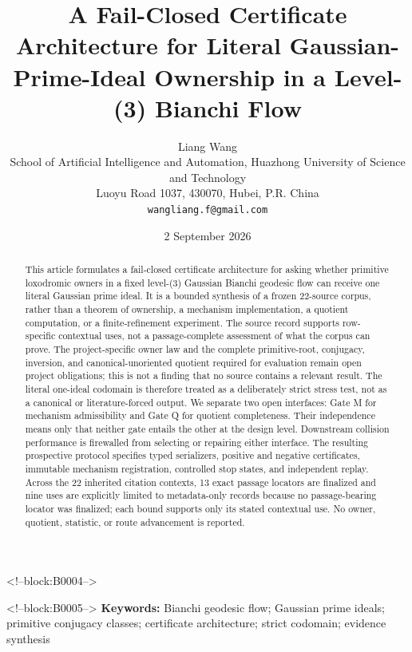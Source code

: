 \documentclass[11pt,a4paper]{article}
\title{A Fail-Closed Certificate Architecture for Literal Gaussian-Prime-Ideal Ownership in a Level-(3) Bianchi Flow}
\author{Liang Wang\\
\small School of Artificial Intelligence and Automation, Huazhong University of Science and Technology\\
\small Luoyu Road 1037, 430070, Hubei, P.R. China\\
\small \texttt{wangliang.f@gmail.com}}
\date{2 September 2026}
\begin{document}
\maketitle

<!--block:B0004-->
\begin{abstract}
This article formulates a fail-closed certificate architecture for asking whether primitive loxodromic owners in a fixed level-(3) Gaussian Bianchi geodesic flow can receive one literal Gaussian prime ideal. It is a bounded synthesis of a frozen 22-source corpus, rather than a theorem of ownership, a mechanism implementation, a quotient computation, or a finite-refinement experiment. The source record supports row-specific contextual uses, not a passage-complete assessment of what the corpus can prove. The project-specific owner law and the complete primitive-root, conjugacy, inversion, and canonical-unoriented quotient required for evaluation remain open project obligations; this is not a finding that no source contains a relevant result. The literal one-ideal codomain is therefore treated as a deliberately strict stress test, not as a canonical or literature-forced output. We separate two open interfaces: Gate M for mechanism admissibility and Gate Q for quotient completeness. Their independence means only that neither gate entails the other at the design level. Downstream collision performance is firewalled from selecting or repairing either interface. The resulting prospective protocol specifies typed serializers, positive and negative certificates, immutable mechanism registration, controlled stop states, and independent replay. Across the 22 inherited citation contexts, 13 exact passage locators are finalized and nine uses are explicitly limited to metadata-only records because no passage-bearing locator was finalized; each bound supports only its stated contextual use. No owner, quotient, statistic, or route advancement is reported.
\end{abstract}

<!--block:B0005-->
\noindent\textbf{Keywords:} Bianchi geodesic flow; Gaussian prime ideals; primitive conjugacy classes; certificate architecture; strict codomain; evidence synthesis
\end{document}
